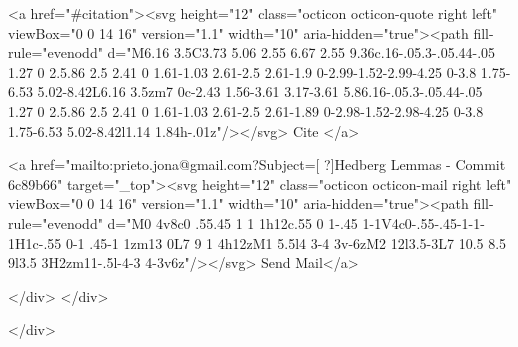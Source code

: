       <a  href="#citation"><svg height="12" class="octicon octicon-quote right left" viewBox="0 0 14 16" version="1.1" width="10" aria-hidden="true"><path fill-rule="evenodd" d="M6.16 3.5C3.73 5.06 2.55 6.67 2.55 9.36c.16-.05.3-.05.44-.05 1.27 0 2.5.86 2.5 2.41 0 1.61-1.03 2.61-2.5 2.61-1.9 0-2.99-1.52-2.99-4.25 0-3.8 1.75-6.53 5.02-8.42L6.16 3.5zm7 0c-2.43 1.56-3.61 3.17-3.61 5.86.16-.05.3-.05.44-.05 1.27 0 2.5.86 2.5 2.41 0 1.61-1.03 2.61-2.5 2.61-1.89 0-2.98-1.52-2.98-4.25 0-3.8 1.75-6.53 5.02-8.42l1.14 1.84h-.01z"/></svg> Cite
      </a>

      <a href="mailto:prieto.jona@gmail.com?Subject=[ ?]Hedberg Lemmas - Commit 6c89b66" target="_top"><svg height="12" class="octicon octicon-mail right left" viewBox="0 0 14 16" version="1.1" width="10" aria-hidden="true"><path fill-rule="evenodd" d="M0 4v8c0 .55.45 1 1 1h12c.55 0 1-.45 1-1V4c0-.55-.45-1-1-1H1c-.55 0-1 .45-1 1zm13 0L7 9 1 4h12zM1 5.5l4 3-4 3v-6zM2 12l3.5-3L7 10.5 8.5 9l3.5 3H2zm11-.5l-4-3 4-3v6z"/></svg> Send Mail</a>

    </div>
  </div>

</div>




